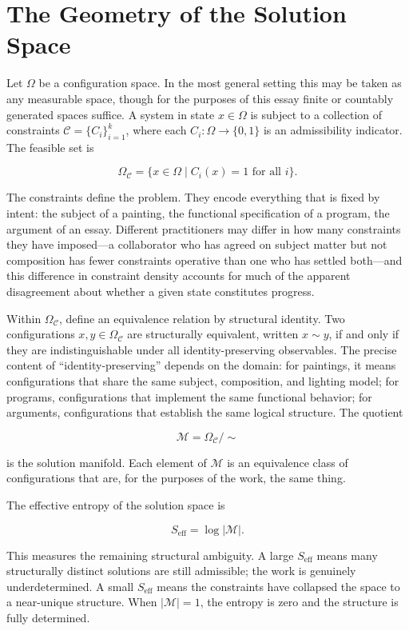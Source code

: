 \documentclass[11pt, twoside]{article}
\theoremstyle{plain}
\theoremstyle{definition}
\theoremstyle{remark}
\newcommand{\OmC}{\Omega_{\mathcal{C}}}
\newcommand{\Seff}{S_{\text{eff}}}
\begin{document}
\section{The Geometry of the Solution Space}
\label{sec:geometry}

Let $\Omega$ be a configuration space. In the most general setting this may be taken as any measurable space, though for the purposes of this essay finite or countably generated spaces suffice. A system in state $x \in \Omega$ is subject to a collection of constraints $\mathcal{C} = \{C_i\}_{i=1}^{k}$, where each $C_i : \Omega \to \{0,1\}$ is an admissibility indicator. The feasible set is

\[
\OmC = \{ x \in \Omega \mid C_i(x) = 1 \text{ for all } i \}.
\]

The constraints define the problem. They encode everything that is fixed by intent: the subject of a painting, the functional specification of a program, the argument of an essay. Different practitioners may differ in how many constraints they have imposed---a collaborator who has agreed on subject matter but not composition has fewer constraints operative than one who has settled both---and this difference in constraint density accounts for much of the apparent disagreement about whether a given state constitutes progress.

Within $\OmC$, define an equivalence relation by structural identity. Two configurations $x, y \in \OmC$ are structurally equivalent, written $x \sim y$, if and only if they are indistinguishable under all identity-preserving observables. The precise content of ``identity-preserving'' depends on the domain: for paintings, it means configurations that share the same subject, composition, and lighting model; for programs, configurations that implement the same functional behavior; for arguments, configurations that establish the same logical structure. The quotient

\[
\mathcal{M} = \OmC / {\sim}
\]

is the solution manifold. Each element of $\mathcal{M}$ is an equivalence class of configurations that are, for the purposes of the work, the same thing.

The effective entropy of the solution space is

\[
\Seff = \log |\mathcal{M}|.
\]

This measures the remaining structural ambiguity. A large $\Seff$ means many structurally distinct solutions are still admissible; the work is genuinely underdetermined. A small $\Seff$ means the constraints have collapsed the space to a near-unique structure. When $|\mathcal{M}| = 1$, the entropy is zero and the structure is fully determined.
\end{document}
